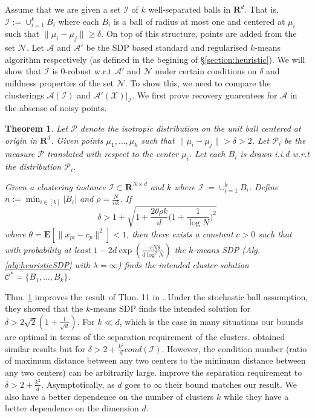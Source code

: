 \documentclass[12pt]{article}
\newcommand{\mc}{\mathcal}
\newcommand{\mb}{\mathbf}
\newtheorem{theorem}{Theorem}
\begin{document}
Assume that we are given a set $\mc I$ of $k$ well-separated balls in $\mb R^d$. That is, $\mc I := \cup_{i=1}^k B_i$ where each $B_i$ is a ball of radius at most one and centered at $\mu_i$ such that $\|\mu_i - \mu_j\| \ge \delta$. On top of this structure, points are added from the set $\mc N$. Let $\mc A$ and $\mc A'$ be the SDP based standard and regularised $k$-means algorithm respectively (as defined in the begining of \S \ref{section:heuristic}). We will show that $\mc I$ is $0$-robust w.r.t $\mc A'$ and $\mc N$ under certain conditions on $\delta$ and mildness properties of the set $\mc N$. To show this, we need to compare the clusterings $\mc A(\mc I)$ and $\mc A'(\mc X)|_{\mc I}$. We first prove recovery guarentees for $\mc A$ in the absense of noisy points.

\begin{theorem}
\label{thm:SDPGeneral}
Let $\mc P$ denote the isotropic distribution on the unit ball centered at origin in $\mb R^d$. Given points $\mu_1, \ldots, \mu_k$ such that $\|\mu_i - \mu_j\| > \delta  > 2$. Let $\mc P_i$ be the measure $\mc P$ translated with respect to the center $\mu_i$. Let each $B_i$ is drawn i.i.d w.r.t the distribution $\mc P_i$. 

Given a clustering instance $\mc I \subset \mb R^{N\times d}$ and $k$ where $\mc I := \cup_{i=1}^k B_i$. Define $ n := \min_{i\in[k]} |B_i|$ and $\rho = \frac{N}{nk}$. If
$$\delta > 1 + \sqrt{1+\frac{2\theta\rho k}{d}\Big(1+\frac{1}{\log N}\Big)^2}$$  
where $\theta = \mb E[\|x_{pi}-c_p\|^2] < 1$, then there exists a constant $c > 0$ such that with probability at least $1 - 2d\exp(\frac{-cN\theta}{d\log^2N})$ the $k$-means SDP (Alg. \ref{alg:heuristicSDP} with $\lambda = \infty$) finds the intended cluster solution  $\mc C^* = \{B_1, \ldots, B_k\}$.
\end{theorem}

Thm. \ref{thm:SDPGeneral} improves the result of Thm. 11 in \cite{awasthi2015relax}. Under the stochastic ball assumption, they showed that the $k$-means SDP finds the intended solution for $\delta > 2\sqrt{2}(1+\frac{1}{\sqrt{d}})$. For $k \ll d$, which is the case in many situations our bounds are optimal in terms of the separation requirement of the clusters.  \cite{iguchi2015tightness} obtained similar results but for $\delta > 2 + \frac{k^2}{d}cond(\mc I)$. However, the condition number (ratio of maximum distance between any two centers to the minimum distance between any two centers) can be arbitrarily large. \cite{iguchi2017probably} improve the separation requirement to $\delta > 2 + \frac{k^2}{d}$. Asymptotically, as $d$ goes to $\infty$ their bound matches our result. We also have a better dependence on the number of clusters $k$ while they have a better dependence on the dimension $d$. 
\end{document}
